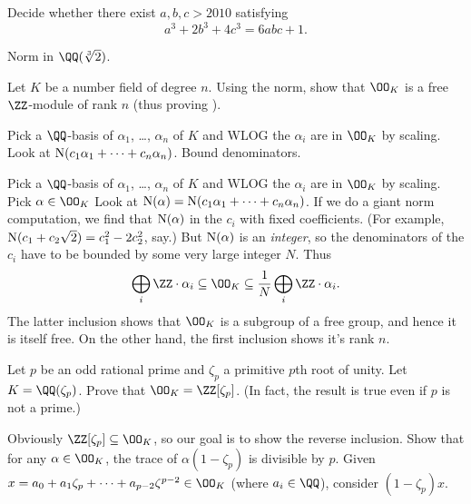 \begin{problem}
	 Decide whether there exist $a,b,c > 2010$ satisfying
	\[ a^3+2b^3+4c^3=6abc+1. \]
	\begin{hint}
		Norm in $\QQ(\sqrt[3]2)$.
	\end{hint}
\end{problem}

\begin{problem}
	\label{prob:OK_free_Z_module}
	\gim
	Let $K$ be a number field of degree $n$.
	Using the norm, show that $\OO_K$ is a free $\ZZ$-module of rank $n$
	(thus proving ).
	\begin{hint}
		Pick a $\QQ$-basis of $\alpha_1$, \dots, $\alpha_n$ of $K$ and WLOG
		the $\alpha_i$ are in $\OO_K$ by scaling.
		Look at $\operatorname{N}(c_1\alpha_1 + \dots + c_n\alpha_n)$.
		Bound denominators.
	\end{hint}
	\begin{sol}
		Pick a $\QQ$-basis of $\alpha_1$, \dots, $\alpha_n$ of $K$ and WLOG
		the $\alpha_i$ are in $\OO_K$ by scaling.
		Pick $\alpha \in \OO_K$
		Look at $\operatorname{N}(\alpha) = \operatorname{N}(c_1\alpha_1 + \dots + c_n\alpha_n)$.
		If we do a giant norm computation, we find that $\operatorname{N}(\alpha)$
		in the $c_i$ with fixed coefficients.
		(For example, $\operatorname{N}(c_1 + c_2\sqrt 2) = c_1^2 - 2c_2^2$, say.)
		But $\operatorname{N}(\alpha)$ is an \emph{integer}, so the denominators of the $c_i$ 
		have to be bounded by some very large integer $N$.
		Thus
		\[
			\bigoplus_i \ZZ \cdot \alpha_i
			\subseteq 
			\OO_K
			\subseteq
			\frac 1N \bigoplus_i \ZZ \cdot \alpha_i.
		\]
		The latter inclusion shows that $\OO_K$ is a subgroup
		of a free group, and hence it is itself free.
		On the other hand, the first inclusion shows it's rank $n$.
	\end{sol}
\end{problem}

\begin{dproblem}
	\yod
	\label{prob:ring_int_cyclotomic}
	Let $p$ be an odd rational prime and $\zeta_p$ a primitive $p$th root of unity.
	Let $K = \QQ(\zeta_p)$.
	Prove that $\OO_K = \ZZ[\zeta_p]$.
	(In fact, the result is true even if $p$ is not a prime.)
	\begin{hint}
		Obviously $\ZZ[\zeta_p] \subseteq \OO_K$, so our goal is to show the reverse inclusion.
		Show that for any $\alpha \in \OO_K$, the trace of $\alpha(1-\zeta_p)$ is divisible by $p$.
		Given $x = a_0 + a_1\zeta_p + \dots + a_{p-2}\zeta^{p-2} \in \OO_K$ (where $a_i \in \QQ$),
		consider $(1-\zeta_p)x$.
	\end{hint}
\end{dproblem}

